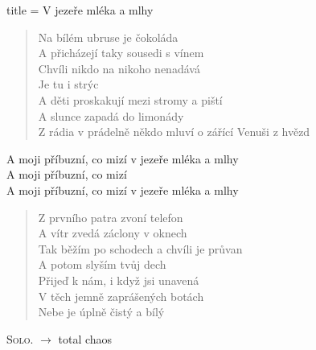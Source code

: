 \begin{song}{title = V jezeře mléka a mlhy}
\begin{verse}
Na bílém ubruse je čokoláda\\
A přicházejí taky sousedi s vínem\\
Chvíli nikdo na nikoho nenadává\\
Je tu i strýc\\
A děti proskakují mezi stromy a piští\\
A slunce zapadá do limonády\\
Z rádia v prádelně někdo mluví o zářící Venuši z hvězd
\end{verse}

\begin{chorus}
A moji příbuzní, co mizí v jezeře mléka a mlhy \\
A moji příbuzní, co mizí  \\
A moji příbuzní, co mizí v jezeře mléka a mlhy 
\end{chorus}

\begin{verse}
Z prvního patra zvoní telefon \\
A vítr zvedá záclony v oknech \\
Tak běžím po schodech a chvíli je průvan \\
A potom slyším tvůj dech \\
Přijeď k nám, i když jsi unavená \\
V těch jemně zaprášených botách \\
Nebe je úplně čistý a bílý
\end{verse}

\textsc{Solo.}   $\rightarrow$ total chaos
\end{song}

\newpage